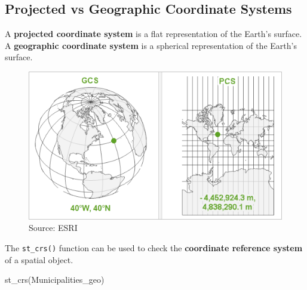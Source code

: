 \documentclass[
  letterpaper,
  DIV=11,
  numbers=noendperiod]{scrreprt}
\newenvironment{Shaded}{\begin{snugshade}}{\end{snugshade}}
\newcommand{\FunctionTok}[1]{\textcolor[rgb]{0.28,0.35,0.67}{#1}}
\newcommand{\NormalTok}[1]{\textcolor[rgb]{0.00,0.23,0.31}{#1}}
\begin{document}
\subsection{Projected vs Geographic Coordinate
Systems}\label{projected-vs-geographic-coordinate-systems}

A \textbf{projected coordinate system} is a flat representation of the
Earth's surface. A \textbf{geographic coordinate system} is a spherical
representation of the Earth's surface.

\begin{figure}[H]

{\centering \includegraphics{images/clipboard-1233124217.png}

}

\caption{Source: ESRI}

\end{figure}%

The \texttt{st\_crs()} function can be used to check the
\textbf{coordinate reference system} of a spatial object.

\begin{Shaded}
\begin{Highlighting}[]
\FunctionTok{st\_crs}\NormalTok{(Municipalities\_geo)}
\end{Highlighting}
\end{Shaded}
\end{document}
